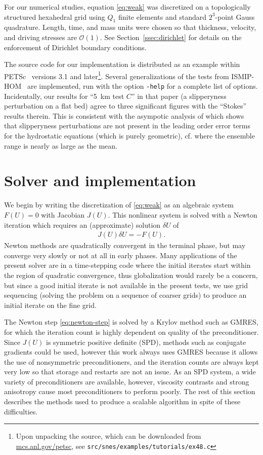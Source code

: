 \documentclass[3p]{elsarticle}
\newcommand{\bigO}{{\mathcal{O}}}
\begin{document}
For our numerical studies, equation \eqref{eq:weak} was discretized on a topologically structured hexahedral grid using $Q_1$ finite elements and standard $2^3$-point Gauss quadrature.  Length, time, and mass units were chosen so that thickness, velocity, and driving stresses are $\bigO(1)$.  See Section~\ref{ssec:dirichlet} for details on the enforcement of Dirichlet boundary conditions.

The source code for our implementation is distributed as an example within PETSc~\cite{petsc-web-page} versions 3.1 and later\footnote{Upon unpacking the source, which can be downloaded from \href{http://mcs.anl.gov/petsc}{mcs.anl.gov/petsc}, see \texttt{src/snes/examples/tutorials/ex48.c}}.  Several generalizations of the tests from ISMIP-HOM~\cite{pattyn2008beh} are implemented, run with the option \texttt{-help} for a complete list of options.  Incidentally, our results for ``\SI{5}{\kilo\metre} test $C$'' in that paper (a slipperyness perturbation on a flat bed) agree to three significant figures with the ``Stokes'' results therein.  This is consistent with the asympotic analysis of \cite{schoof2010thin} which shows that slipperyness perturbations are not present in the leading order error terms for the hydrostatic equations (which is purely geometric), cf. \cite[Table~4 and Figure~8]{pattyn2008beh} where the ensemble range is nearly as large as the mean.

\section{Solver and implementation}\label{sec:solver}
We begin by writing the discretization of \eqref{eq:weak} as an algebraic system $F(U) = 0$ with
Jacobian $J(U)$.  This nonlinear system is solved with a Newton iteration which requires an
(approximate) solution $\delta U$ of
\begin{align}\label{eq:newton-step}
  J(U)\delta U = -F(U) .
\end{align}
Newton methods are quadratically convergent in the terminal phase, but may converge very slowly or
not at all in early phases.  Many applications of the present solver are in a time-stepping code
where the initial iterates start within the region of quadratic convergence, thus globalization
would rarely be a concern, but since a good initial iterate is not available in the present tests,
we use grid sequencing (solving the problem on a sequence of coarser grids) to produce an initial
iterate on the fine grid.

The Newton step \eqref{eq:newton-step} is solved by a Krylov method such as GMRES, for which the iteration count is highly dependent on quality of the preconditioner.  Since $J(U)$ is symmetric positive definite (SPD), methods such as conjugate gradients could be used, however this work always uses GMRES because it allows the use of nonsymmetric preconditioners, and the iteration counts are always kept very low so that storage and restarts are not an issue.  As an SPD system, a wide variety of preconditioners are available, however, viscosity contrasts and strong anisotropy cause most preconditioners to perform poorly.  The rest of this section describes the methods used to produce a scalable algorithm in spite of these difficulties.
\end{document}
